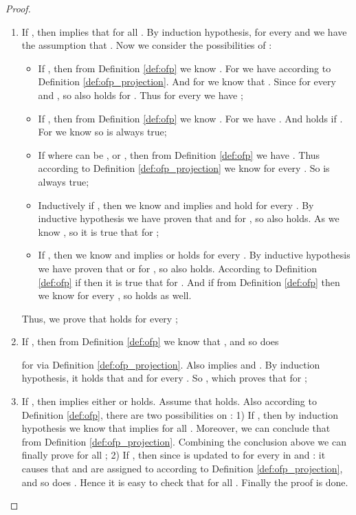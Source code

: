 \documentclass[conference]{IEEEtran}
\newtheorem{proof}{IEEEproof}
\begin{document}
\begin{proof}
\begin{enumerate}
    
    \item If , then  implies that  for all . 
    By induction hypothesis, for every  and  we have the assumption that 
    . Now we consider the possibilities of :
    \begin{itemize}
      \item If , then from Definition \ref{def:ofp} 
      we know . For  we have  according to Definition \ref{def:ofp_projection}. And for  we know 
      that . Since  for every  and , so  also holds for . 
      Thus for every  we have ;
      \item If , then from Definition \ref{def:ofp} 
      we know . For  we have . And  holds if . For  we know  so  is always true;
      \item If  where  can be ,  or , then 
      from Definition \ref{def:ofp} we have . Thus according to Definition \ref{def:ofp_projection} we know  for every 
      . So  is always true;
      \item Inductively if , then we know  and  implies  and  hold for every . By inductive hypothesis we have proven that  and  for , so  also holds. As we know , so it is true that 
       for ;
      \item If , then we know  and  implies  or  holds for every . By inductive hypothesis we have proven that  or  for , so  also holds. 
      According to Definition \ref{def:ofp} if  then it is true that  for . And if  from Definition \ref{def:ofp} then we know  for every , so  holds as well. 
    \end{itemize}
    Thus, we prove that  holds for every ;
    
    
    \item If , then from Definition \ref{def:ofp} we know that 
    , and so does 
     
    for  via Definition \ref{def:ofp_projection}. 
    Also  implies  and . 
    By induction hypothesis, it holds that  and 
     for every . 
    So , 
    which proves that  for ;
    
    
    \item If , then  implies either  or 
     holds. Assume that  holds. 
    Also according to Definition \ref{def:ofp}, there are two possibilities 
    on : 1) If , then by induction hypothesis 
    we know that  implies  for all 
    . Moreover, we can conclude that 
     from Definition 
    \ref{def:ofp_projection}. Combining the conclusion above we can 
    finally prove  for all 
    ; 2) If , then since  is updated to 
     for every  in 
     and : it causes that  and 
     are assigned to  according to Definition 
    \ref{def:ofp_projection}, and so does . Hence it is 
    easy to check that  for all 
    . Finally the proof is done.
  \end{enumerate}
  
\end{proof}
\end{document}
